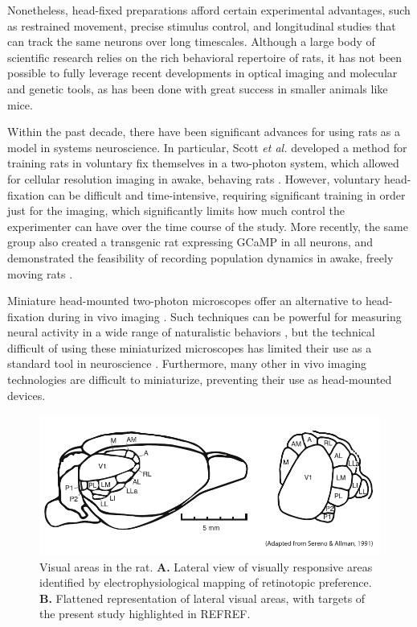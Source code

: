 Nonetheless, head-fixed preparations afford certain experimental advantages, such as restrained movement, precise stimulus control, and longitudinal studies that can track the same neurons over long timescales. Although a large body of scientific research relies on the rich behavioral repertoire of rats, it has not been possible to fully leverage recent developments in optical imaging and molecular and genetic tools, as has been done with great success in smaller animals like mice. 

Within the past decade, there have been significant advances for using rats as a model in systems neuroscience. In particular, Scott \textit{et al.} developed a method for training rats in voluntary fix themselves in a two-photon system, which allowed for cellular resolution imaging in awake, behaving rats \cite{Scott2013}. However, voluntary head-fixation can be difficult and time-intensive, requiring significant training in order just for the imaging, which significantly limits how much control the experimenter can have over the time course of the study. More recently, the same group also created a transgenic rat expressing GCaMP in all neurons, and demonstrated the feasibility of recording population dynamics in awake, freely moving rats \cite{Scott2018ImagingMacroscope}. 

Miniature head-mounted two-photon microscopes offer an alternative to head-fixation during in vivo imaging \cite{Helmchen2001, Piyawattanametha2009, Sawinski2009}. Such techniques can be powerful for measuring neural activity in a wide range of naturalistic behaviors \cite{Sawinski2009}, but the technical difficult of using these miniaturized microscopes has limited their use as a standard tool in neuroscience \cite{Kerr2012}. Furthermore, many other in vivo imaging technologies are difficult to miniaturize, preventing their use as head-mounted devices. 

\begin{figure}[t!]
    \includegraphics[width=\textwidth]{figures/chapter_2/fig_2-1_rat_visual_areas/rat_visual_areas.pdf}
    \vspace{.1in}
    \caption[Visual areas in the rat]{Visual areas in the rat. \textbf{A.} Lateral view of visually responsive areas identified by electrophysiological mapping of retinotopic preference. \textbf{B.} Flattened representation of lateral visual areas, with targets of the present study highlighted in REFREF. 
    \label{fig:rat_visual_areas}}
\end{figure}

